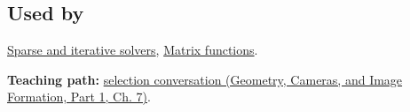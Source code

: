 \subsection{Used by}\label{appendix-221a483bec2d-used-by}

\hypertarget{appendix-221a483bec2d-used-by}{}

\hyperref[appendix-67c87a3d9e94]{Sparse and iterative solvers}, \hyperref[appendix-0f4bc2bf2b1f]{Matrix functions}.

\textbf{Teaching path:} \href{../03-Geometry-Cameras-and-Image-Formation-P01/main.pdf\#nameddest=02-foundations-ii-ch038-close-the-journey-with-an-algorithm-selection-conversation}{selection conversation (Geometry, Cameras, and Image Formation, Part 1, Ch. 7)}.
